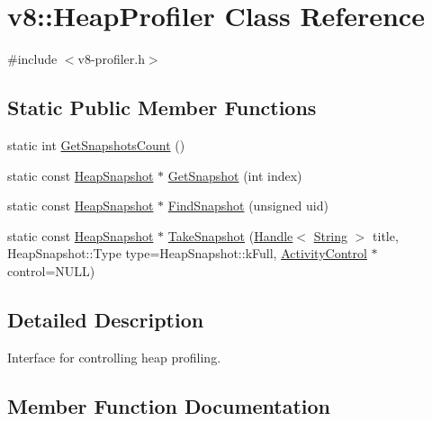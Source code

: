\hypertarget{classv8_1_1_heap_profiler}{}\section{v8\+:\+:Heap\+Profiler Class Reference}
\label{classv8_1_1_heap_profiler}


{\ttfamily \#include $<$v8-\/profiler.\+h$>$}

\subsection*{Static Public Member Functions}
\begin{DoxyCompactItemize}
\item 
static int \hyperlink{classv8_1_1_heap_profiler_a739a665268bba6e640890464ccb60d26}{Get\+Snapshots\+Count} ()
\item 
static const \hyperlink{classv8_1_1_heap_snapshot}{Heap\+Snapshot} $\ast$ \hyperlink{classv8_1_1_heap_profiler_ad547f406908880cc7dc0453fe83cc216}{Get\+Snapshot} (int index)
\item 
static const \hyperlink{classv8_1_1_heap_snapshot}{Heap\+Snapshot} $\ast$ \hyperlink{classv8_1_1_heap_profiler_a1f77545176060f21239bd1a78e3967a7}{Find\+Snapshot} (unsigned uid)
\item 
static const \hyperlink{classv8_1_1_heap_snapshot}{Heap\+Snapshot} $\ast$ \hyperlink{classv8_1_1_heap_profiler_a39e6df3b54335e183ca57edae1dc78e7}{Take\+Snapshot} (\hyperlink{classv8_1_1_handle}{Handle}$<$ \hyperlink{classv8_1_1_string}{String} $>$ title, Heap\+Snapshot\+::\+Type type=Heap\+Snapshot\+::k\+Full, \hyperlink{classv8_1_1_activity_control}{Activity\+Control} $\ast$control=N\+U\+L\+L)
\end{DoxyCompactItemize}


\subsection{Detailed Description}
Interface for controlling heap profiling. 

\subsection{Member Function Documentation}
\hypertarget{classv8_1_1_heap_profiler_a1f77545176060f21239bd1a78e3967a7}{}
